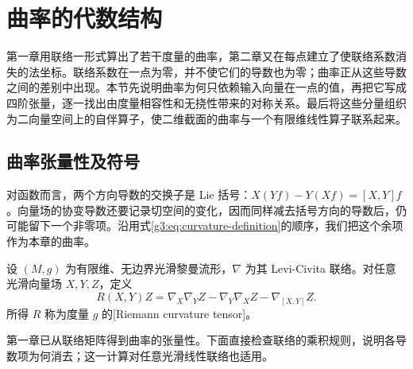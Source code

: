 
% 
% 

\section{曲率的代数结构}
\label{g3:sec:0301}

第一章用联络一形式算出了若干度量的曲率，第二章又在每点建立了使联络系数消失的法坐标。联络系数在一点为零，并不使它们的导数也为零；曲率正从这些导数之间的差别中出现。本节先说明曲率为何只依赖输入向量在一点的值，再把它写成四阶张量，逐一找出由度量相容性和无挠性带来的对称关系。最后将这些分量组织为二向量空间上的自伴算子，使二维截面的曲率与一个有限维线性算子联系起来。

\subsection{曲率张量性及符号}
\label{g3:subsec:0301:01}

对函数而言，两个方向导数的交换子是 Lie 括号：\(X(Yf)-Y(Xf)=[X,Y]f\)。向量场的协变导数还要记录切空间的变化，因而同样减去括号方向的导数后，仍可能留下一个非零项。沿用式\eqref{g3:eq:curvature-definition}的顺序，我们把这个余项作为本章的曲率。

\begin{definition}\label{g3:def:riemann-curvature}
	设 \((M,g)\) 为有限维、无边界光滑黎曼流形，\(\nabla\) 为其 Levi-Civita 联络。对任意光滑向量场 \(X,Y,Z\)，定义
	\[
		R(X,Y)Z
		=\nabla_X\nabla_YZ-\nabla_Y\nabla_XZ-\nabla_{[X,Y]}Z.
	\]
	所得 \(R\) 称为度量 \(g\) 的[Riemann curvature tensor]。
\end{definition}

第一章已从联络矩阵得到曲率的张量性。下面直接检查联络的乘积规则，说明各导数项为何消去；这一计算对任意光滑线性联络也适用。

